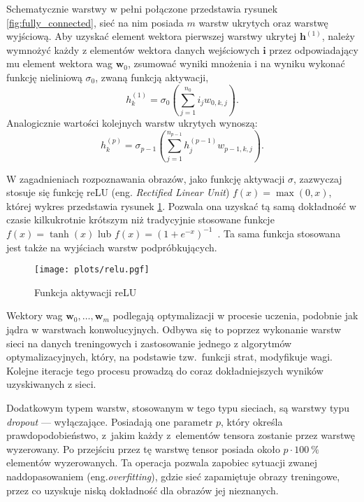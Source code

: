 \documentclass[pl,12pt]{aghdpl}
\begin{document}
Schematycznie warstwy w pełni połączone przedstawia rysunek
\ref{fig:fully_connected}, sieć na nim posiada $m$ warstw ukrytych oraz warstwę
wyjściową. Aby uzyskać element wektora pierwszej warstwy ukrytej $\bm h^{(1)}$,
należy wymnożyć każdy z elementów wektora danych wejściowych $\bm i$ przez
odpowiadający mu element wektora wag $\bm w_{0}$, zsumować wyniki mnożenia i
na wyniku wykonać funkcję nieliniową $\sigma_0$, zwaną funkcją aktywacji,
\begin{equation}
  h_k^{(1)} = \sigma_0\left(\sum_{j=1}^{n_0}i_jw_{0,k,j}\right).
\end{equation}
Analogicznie wartości kolejnych warstw ukrytych wynoszą:
\begin{equation}
  h_k^{(p)} = \sigma_{p-1}\left(\sum_{j=1}^{n_{p-1}}h_j^{(p-1)}w_{p-1,k,j}\right).
\end{equation}

W zagadnieniach rozpoznawania obrazów, jako funkcję aktywacji $\sigma$, zazwyczaj
stosuje się funkcję reLU (eng. \textit{Rectified Linear Unit}) $f(x) =
\max(0,x)$, której wykres przedstawia rysunek \ref{fig:reLU}. Pozwala ona
uzyskać tą samą dokładność w czasie kilkukrotnie krótszym niż tradycyjnie
stosowane funkcje $f(x) = \tanh(x)$ lub $f(x) = (1 +
e^{-x})^{-1}$~\cite{KrizhevskySutskeverHinton2012}. Ta sama
funkcja stosowana jest także na wyjściach warstw podpróbkujących.

\begin{figure}[!tbh]
  \centering
  \texttt{[image: plots/relu.pgf]}
  \caption{Funkcja aktywacji reLU}
  \label{fig:reLU}
\end{figure}

Wektory wag $\bm w_0,\dotsc,\bm w_m$ podlegają optymalizacji w procesie
uczenia, podobnie jak jądra w warstwach konwolucyjnych. Odbywa się to poprzez
wykonanie warstw sieci na danych treningowych i zastosowanie jednego z
algorytmów optymalizacyjnych, który, na podstawie tzw.\ funkcji strat, modyfikuje wagi.
Kolejne iteracje tego procesu prowadzą do coraz dokładniejszych wyników
uzyskiwanych z sieci.

Dodatkowym typem warstw, stosowanym w tego typu sieciach, są warstwy typu
\textit{dropout} --- wyłączające. Posiadają one parametr $p$, który określa
prawdopodobieństwo, z~jakim każdy z~elementów tensora zostanie przez warstwę
wyzerowany. Po przejściu przez tę warstwę tensor posiada około
$p\cdot\SI{100}{\percent}$ elementów wyzerowanych. Ta operacja pozwala zapobiec
sytuacji zwanej naddopasowaniem (eng.\textit{overfitting}), gdzie sieć
zapamiętuje obrazy treningowe, przez co uzyskuje niską dokładność dla obrazów jej
nieznanych.
\end{document}
